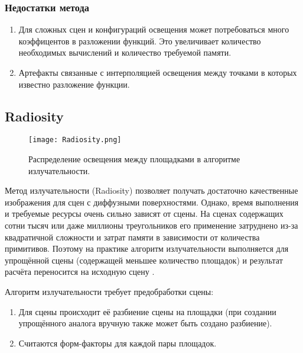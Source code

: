 \documentclass[12pt,fleqn]{article}
\begin{document}
\subsubsection{Недостатки метода}

\begin{enumerate}

\item Для сложных сцен и конфигураций освещения может потребоваться много коэффицентов в разложении функций. Это увеличивает количество необходимых вычислений и количество требуемой памяти.

\item Артефакты связанные с интерполяцией освещения между точками в которых известно разложение функции.

\end{enumerate}

\subsection{Radiosity}

\begin{figure}[htb]
    \centering
    \texttt{[image: Radiosity.png]}
    \caption{Распределение освещения между площадками в алгоритме излучательности.}
    \label{Radiosity}
\end{figure}

Метод излучательности (Radiosity) \cite{Radiosity, Radiosity2, Radiosity3, GPURadiosity} позволяет получать достаточно качественные изображения для сцен с диффузными поверхностями. Однако, время выполнения и требуемые ресурсы очень сильно зависят от сцены. На сценах содержащих сотни тысяч или даже миллионы треугольников его применение затруднено из-за квадратичной сложности и затрат памяти в зависимости от количества примитивов. Поэтому на практике алгоритм излучательности выполняется для упрощённой сцены (содержащей меньшее количество площадок) и результат расчёта переносится на исходную сцену \cite{Simplification}.

Алгоритм излучательности требует предобработки сцены:

\begin{enumerate}

\item Для сцены происходит её разбиение сцены на площадки (при создании упрощённого аналога вручную также может быть создано разбиение).

\item Считаются форм-факторы для каждой пары площадок.

\end{enumerate}
\end{document}
